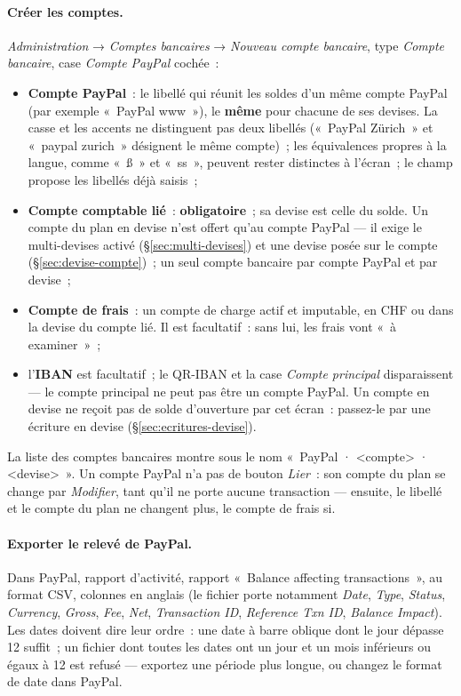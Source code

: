 \documentclass[a4paper,11pt,oneside]{article}
\begin{document}
\paragraph{Créer les comptes.} \emph{Administration} → \emph{Comptes bancaires} → \emph{Nouveau compte bancaire}, type \emph{Compte bancaire}, case \emph{Compte PayPal} cochée~:
\begin{itemize}
    \item \textbf{Compte PayPal}~: le libellé qui réunit les soldes d'un même compte PayPal (par exemple «~PayPal www~»), le \textbf{même} pour chacune de ses devises. La casse et les accents ne distinguent pas deux libellés («~PayPal Zürich~» et «~paypal zurich~» désignent le même compte)~; les équivalences propres à la langue, comme «~ß~» et «~ss~», peuvent rester distinctes à l'écran~; le champ propose les libellés déjà saisis~;
    \item \textbf{Compte comptable lié}~: \textbf{obligatoire}~; sa devise est celle du solde. Un compte du plan en devise n'est offert qu'au compte PayPal --- il exige le multi-devises activé (\S\ref{sec:multi-devises}) et une devise posée sur le compte (\S\ref{sec:devise-compte})~; un seul compte bancaire par compte PayPal et par devise~;
    \item \textbf{Compte de frais}~: un compte de charge actif et imputable, en CHF ou dans la devise du compte lié. Il est facultatif~: sans lui, les frais vont «~à examiner~»~;
    \item l'\textbf{IBAN} est facultatif~; le QR-IBAN et la case \emph{Compte principal} disparaissent --- le compte principal ne peut pas être un compte PayPal. Un compte en devise ne reçoit pas de solde d'ouverture par cet écran~: passez-le par une écriture en devise (\S\ref{sec:ecritures-devise}).
\end{itemize}
La liste des comptes bancaires montre sous le nom «~PayPal · <compte> · <devise>~». Un compte PayPal n'a pas de bouton \emph{Lier}~: son compte du plan se change par \emph{Modifier}, tant qu'il ne porte aucune transaction --- ensuite, le libellé et le compte du plan ne changent plus, le compte de frais si.

\paragraph{Exporter le relevé de PayPal.} Dans PayPal, rapport d'activité, rapport «~Balance affecting transactions~», au format CSV, colonnes en anglais (le fichier porte notamment \emph{Date}, \emph{Type}, \emph{Status}, \emph{Currency}, \emph{Gross}, \emph{Fee}, \emph{Net}, \emph{Transaction ID}, \emph{Reference Txn ID}, \emph{Balance Impact}). Les dates doivent dire leur ordre~: une date à barre oblique dont le jour dépasse 12 suffit~; un fichier dont toutes les dates ont un jour et un mois inférieurs ou égaux à 12 est refusé --- exportez une période plus longue, ou changez le format de date dans PayPal.
\end{document}
